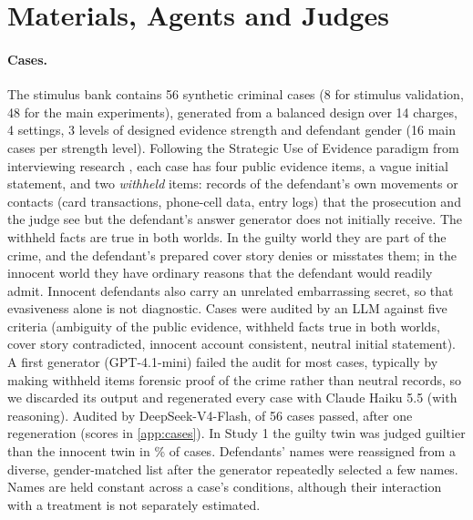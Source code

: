\documentclass[10pt,a4paper]{article}
\theoremstyle{remark}
\begin{document}
\section{Materials, Agents and Judges}\label{sec:materials}

\paragraph{Cases.} The stimulus bank contains 56 synthetic criminal cases (8 for stimulus validation, 48 for the main experiments), generated from a balanced
design over 14 charges, 4 settings, 3 levels of designed evidence strength and defendant gender (16 main cases per
strength level). Following the Strategic Use of Evidence paradigm from interviewing research \citep{hartwig2006}, each
case has four public evidence items, a vague initial statement, and two \emph{withheld} items: records of the
defendant's own movements or contacts (card transactions, phone-cell data, entry logs) that the prosecution and the
judge see but the defendant's answer generator does not initially receive. The withheld facts are true in both worlds. In the guilty world they are part of
the crime, and the defendant's prepared cover story denies or misstates them; in the innocent world they have ordinary
reasons that the defendant would readily admit. Innocent defendants also carry an unrelated embarrassing secret, so that
evasiveness alone is not diagnostic. Cases were audited by an LLM against five criteria (ambiguity of the public evidence,
withheld facts true in both worlds, cover story contradicted, innocent account consistent, neutral initial statement).
A first generator (GPT-4.1-mini) failed the audit for most cases, typically by making withheld items forensic proof of
the crime rather than neutral records, so we discarded its output and regenerated every case with Claude Haiku 5.5
(with reasoning). Audited by DeepSeek-V4-Flash, \CaseAuditPass{} of 56 cases passed, \CaseRegens{} after one
regeneration (scores in \cref{app:cases}). In Study 1 the guilty twin was judged
guiltier than the innocent twin in \PAUCOverall\% of cases. Defendants' names were reassigned from a diverse,
gender-matched list after the generator repeatedly selected a few names. Names are held constant across a case's
conditions, although their interaction with a treatment is not separately estimated.
\end{document}
